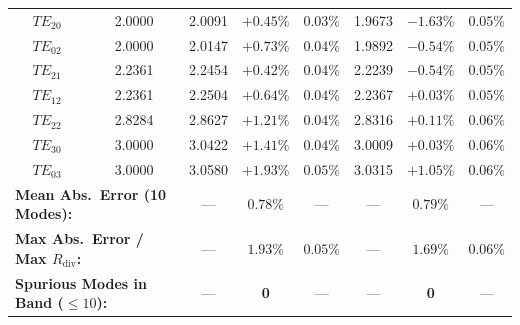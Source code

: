 \documentclass[VANCOUVER]{USG}
\begin{document}
\begin{table}[!t]
{\begin{tabular}{cccccccc}
            $TE_{20}$     & 2.0000                                                 & 2.0091                            & $+0.45\%$            & $0.03\%$                        & 1.9673                            & $-1.63\%$            & $0.05\%$                        \\
            $TE_{02}$     & 2.0000                                                 & 2.0147                            & $+0.73\%$            & $0.04\%$                        & 1.9892                            & $-0.54\%$            & $0.05\%$                        \\
            $TE_{21}$     & 2.2361                                                 & 2.2454                            & $+0.42\%$            & $0.04\%$                        & 2.2239                            & $-0.54\%$            & $0.05\%$                        \\
            $TE_{12}$     & 2.2361                                                 & 2.2504                            & $+0.64\%$            & $0.04\%$                        & 2.2367                            & $+0.03\%$            & $0.05\%$                        \\
            $TE_{22}$     & 2.8284                                                 & 2.8627                            & $+1.21\%$            & $0.04\%$                        & 2.8316                            & $+0.11\%$            & $0.06\%$                        \\
            $TE_{30}$     & 3.0000                                                 & 3.0422                            & $+1.41\%$            & $0.04\%$                        & 3.0009                            & $+0.03\%$            & $0.06\%$                        \\
            $TE_{03}$     & 3.0000                                                 & 3.0580                            & $+1.93\%$            & $0.05\%$                        & 3.0315                            & $+1.05\%$            & $0.06\%$                        \\
            \midrule
            \multicolumn{2}{l}{\textbf{Mean Abs.\ Error (10 Modes):}} & --- & $\mathbf{0.78\%}$ & --- & --- & $\mathbf{0.79\%}$ & --- \\
            \multicolumn{2}{l}{\textbf{Max Abs.\ Error / Max $R_{\mathrm{div}}$:}} & --- & $1.93\%$ & $0.05\%$ & --- & $1.69\%$ & $0.06\%$ \\
            \multicolumn{2}{l}{\textbf{Spurious Modes in Band ($\le 10$):}} & --- & \textbf{0} & --- & --- & \textbf{0} & --- \\
            \bottomrule
        \end{tabular}
    }
\end{table}
\end{document}
